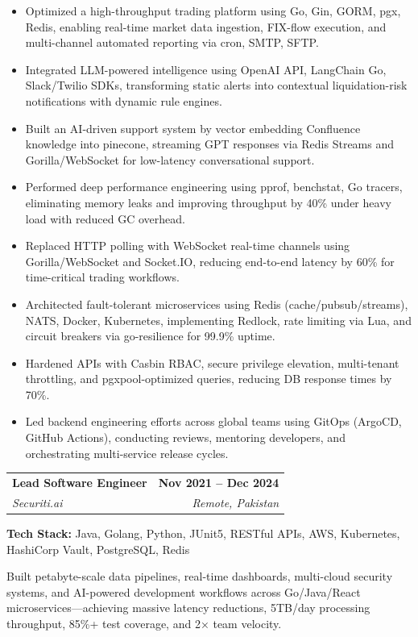 \documentclass[letterpaper,11pt]{article}
\makeatletter
\newcommand{\resumeItem}[1]{
  \item\small{
    {#1 \vspace{-2pt}}
  }
}
\newcommand{\resumeJobHeading}[4]{
  \vspace{-2pt}\item
    \begin{tabular*}{0.97\textwidth}[t]{l@{\extracolsep{\fill}}r}
      \textbf{#1} & \textbf{#2} \\
      \textit{\small#3} & \textit{\small #4} \\
    \end{tabular*}\vspace{5pt}
}
\newcommand{\resumeItemListStart}{\begin{itemize}}
\newcommand{\resumeItemListEnd}{\end{itemize}\vspace{-5pt}}
\makeatother
\begin{document}
      \resumeItemListStart
        \resumeItem{Optimized a high-throughput trading platform using Go, Gin, GORM, pgx, Redis, enabling real-time market data ingestion, FIX-flow execution, and multi-channel automated reporting via cron, SMTP, SFTP.}
        \resumeItem{Integrated LLM-powered intelligence using OpenAI API, LangChain Go, Slack/Twilio SDKs, transforming static alerts into contextual liquidation-risk notifications with dynamic rule engines.}
        \resumeItem{Built an AI-driven support system by vector embedding Confluence knowledge into pinecone, streaming GPT responses via Redis Streams and Gorilla/WebSocket for low-latency conversational support.}
        \resumeItem{Performed deep performance engineering using pprof, benchstat, Go tracers, eliminating memory leaks and improving throughput by 40\% under heavy load with reduced GC overhead.}
        \resumeItem{Replaced HTTP polling with WebSocket real-time channels using Gorilla/WebSocket and Socket.IO, reducing end-to-end latency by 60\% for time-critical trading workflows.}
        \resumeItem{Architected fault-tolerant microservices using Redis (cache/pubsub/streams), NATS, Docker, Kubernetes, implementing Redlock, rate limiting via Lua, and circuit breakers via go-resilience for 99.9\% uptime.}
        \resumeItem{Hardened APIs with Casbin RBAC, secure privilege elevation, multi-tenant throttling, and pgxpool-optimized queries, reducing DB response times by 70\%.}
        \resumeItem{Led backend engineering efforts across global teams using GitOps (ArgoCD, GitHub Actions), conducting reviews, mentoring developers, and orchestrating multi-service release cycles.}
      \resumeItemListEnd
      \vspace{10pt}

    \resumeJobHeading
      {Lead Software Engineer}{Nov 2021 -- Dec 2024}
      {Securiti.ai}{Remote, Pakistan}
      
      \textbf{Tech Stack:} Java, Golang, Python, JUnit5, RESTful APIs, AWS, Kubernetes, HashiCorp Vault, PostgreSQL, Redis
      
      \vspace{3pt}
      \small{Built petabyte-scale data pipelines, real-time dashboards, multi-cloud security systems, and AI-powered development workflows across Go/Java/React microservices—achieving massive latency reductions, 5TB/day processing throughput, 85\%+ test coverage, and 2× team velocity.}
      
\end{document}
